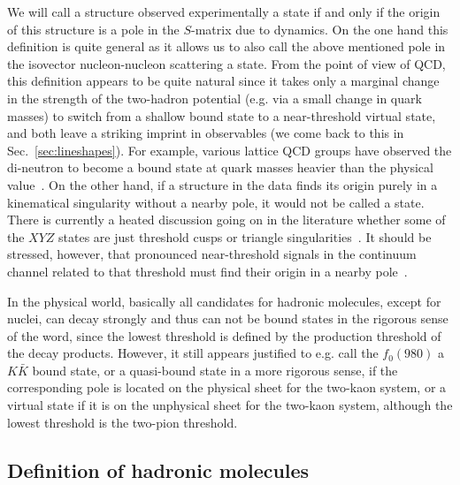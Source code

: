 We will call a structure observed experimentally a state if and only if the
origin of this structure is a pole in the $S$-matrix due to dynamics.
On the one hand this definition is quite general as it allows us to also call
the above mentioned pole in the isovector nucleon-nucleon scattering a state.
From the point of view of QCD, this definition appears to be quite natural since
it takes only a marginal change in the strength of the two-hadron potential
(e.g. via a small change in quark masses) to switch from a shallow bound state
to a near-threshold virtual state, and both leave a striking imprint in
observables (we come back to this in Sec.~\ref{sec:lineshapes}). 
{For example, various lattice QCD groups have observed the di-neutron to become a bound
state at quark masses heavier than the physical
value~\cite{Beane:2012vq,Yamazaki:2012hi,Yamazaki:2015asa,Berkowitz:2015eaa}.}
On the other hand, if a structure in the data finds its origin purely in a
kinematical singularity without a nearby pole, it would not be called a state.
There is currently a heated discussion going on in the literature whether some
of the $XYZ$ states are just threshold cusps or triangle
singularities~\cite{Bugg:2004rk,Chen:2011pv,Chen:2013coa,Swanson:2014tra,
Swanson:2015bsa,Pilloni:2016obd,Gong:2016jzb}.
It should be stressed, however, that pronounced near-threshold signals in the
continuum channel related to that threshold must find their origin in a nearby
pole~\cite{Guo:2014iya}.

 {In the physical world, }basically all candidates for hadronic molecules,
 {except for nuclei,} can decay strongly and thus can not be bound
 states in the rigorous sense of the word, since the lowest threshold is defined
 by the production threshold of the decay products.
 However, it still appears justified to e.g. call the $f_0(980)$ a $K\bar K$
 bound state, {or a quasi-bound state in a more rigorous sense,}
  if the corresponding pole is located on the physical sheet for
 the two-kaon system, or a virtual state if it is on the unphysical sheet for
 the two-kaon system, although the lowest threshold is the two-pion threshold.
 

\subsection{Definition of hadronic molecules}
\label{sec:wein}

